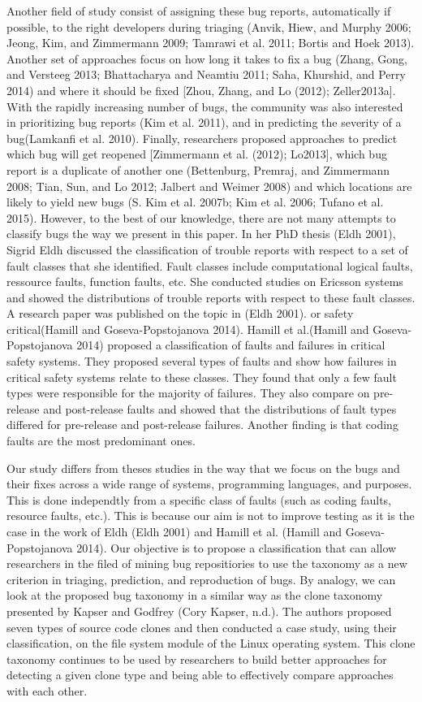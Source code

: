 \documentclass[natbib]{svjour3}
\begin{document}
Another field of study consist of assigning these bug reports,
automatically if possible, to the right developers during triaging
(Anvik, Hiew, and Murphy 2006; Jeong, Kim, and Zimmermann 2009; Tamrawi
et al. 2011; Bortis and Hoek 2013). Another set of approaches focus on
how long it takes to fix a bug (Zhang, Gong, and Versteeg 2013;
Bhattacharya and Neamtiu 2011; Saha, Khurshid, and Perry 2014) and where
it should be fixed {[}Zhou, Zhang, and Lo (2012); Zeller2013a{]}. With
the rapidly increasing number of bugs, the community was also interested
in prioritizing bug reports (Kim et al. 2011), and in predicting the
severity of a bug(Lamkanfi et al. 2010). Finally, researchers proposed
approaches to predict which bug will get reopened {[}Zimmermann et al.
(2012); Lo2013{]}, which bug report is a duplicate of another one
(Bettenburg, Premraj, and Zimmermann 2008; Tian, Sun, and Lo 2012;
Jalbert and Weimer 2008) and which locations are likely to yield new
bugs (S. Kim et al. 2007b; Kim et al. 2006; Tufano et al. 2015).
However, to the best of our knowledge, there are not many attempts to
classify bugs the way we present in this paper. In her PhD thesis (Eldh
2001), Sigrid Eldh discussed the classification of trouble reports with
respect to a set of fault classes that she identified. Fault classes
include computational logical faults, ressource faults, function faults,
etc. She conducted studies on Ericsson systems and showed the
distributions of trouble reports with respect to these fault classes. A
research paper was published on the topic in (Eldh 2001). or safety
critical(Hamill and Goseva-Popstojanova 2014). Hamill et al.(Hamill and
Goseva-Popstojanova 2014) proposed a classification of faults and
failures in critical safety systems. They proposed several types of
faults and show how failures in critical safety systems relate to these
classes. They found that only a few fault types were responsible for the
majority of failures. They also compare on pre-release and post-release
faults and showed that the distributions of fault types differed for
pre-release and post-release failures. Another finding is that coding
faults are the most predominant ones.

Our study differs from theses studies in the way that we focus on the
bugs and their fixes across a wide range of systems, programming
languages, and purposes. This is done independtly from a specific class
of faults (such as coding faults, resource faults, etc.). This is
because our aim is not to improve testing as it is the case in the work
of Eldh (Eldh 2001) and Hamill et al. (Hamill and Goseva-Popstojanova
2014). Our objective is to propose a classification that can allow
researchers in the filed of mining bug repositiories to use the taxonomy
as a new criterion in triaging, prediction, and reproduction of bugs. By
analogy, we can look at the proposed bug taxonomy in a similar way as
the clone taxonomy presented by Kapser and Godfrey (Cory Kapser, n.d.).
The authors proposed seven types of source code clones and then
conducted a case study, using their classification, on the file system
module of the Linux operating system. This clone taxonomy continues to
be used by researchers to build better approaches for detecting a given
clone type and being able to effectively compare approaches with each
other.
\end{document}
